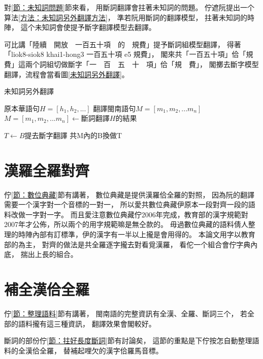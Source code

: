 對\ref{節：未知詞問題}節來看，
用斷詞翻譯會拄著未知詞的問題。
佇遮阮提出一个算法\ref{方法：未知詞另外翻譯方法}，
準若阮用斷詞的翻譯模型，
拄著未知詞的時陣，
這个未知詞會使提予斷字翻譯模型去翻譯。

可比講「陸續　開放　一百五十項　的　規費」提予斷詞組模型翻譯，
得著「liok8-siok8 khai1-hong3 一百五十項 e5 規費」，
閣來共「一百五十項」佮「規費」這兩个詞組切做斷字「一　百　五　十　項」佮「規　費」，
閣擲去斷字模型翻譯，流程會當看圖\ref{未知詞另外翻譯}。

\begin{algorithm}
  \caption{未知詞另外翻譯}
  \label{方法：未知詞另外翻譯方法}
  \begin{algorithmic}
    \REQUIRE \( 原本華語句H = [h_{1}, h_{2},...] \)
    \ENSURE \( 翻譯閩南語句M = [m_{1}, m_{2},...m_{n}] \)
    \STATE \( M = [m_{1}, m_{2},...m_{n}] \gets 斷詞翻譯H的結果 \)
    
		\STATE \( T \gets B提去斷字翻譯 \)
		\STATE 共M內的B換做T
	\ENDWHILE
  \end{algorithmic}
\end{algorithm}


\section{漢羅全羅對齊}
\label{節：漢羅全羅對齊}
佇\ref{節：數位典藏}節有講著，
數位典藏是提供漢羅佮全羅的對照，
因為阮的翻譯需要一个漢字對一个音標的一對一，
所以愛共數位典藏伊原本一段對齊一段的語料改做一字對一字。
而且愛注意數位典藏佇2006年完成，教育部的漢字規範對2007年才公佈，所以兩个的用字規範嘛是無仝款的。
毋過數位典藏的語料倩人整理的時陣內部有訂標準，伊的漢字有一半以上攏是會用得的。
本論文用字以教育部的為主，
對齊的做法是共全羅逐字攏去對看覓漢羅，
看佗一个組合會佇字典內底，
揣出上長的組合。


\section{補全漢佮全羅}
\label{節：補全漢佮全羅}
佇\ref{節：整理語料}節有講著，
閩南語的完整資訊有全漢、全羅、斷詞三个，
若全部的語料攏有這三種資訊，
翻譯效果會閣較好。

斷詞的部份佇\ref{節：拄好長度斷詞}節有討論矣，
這節的重點是下佇按怎自動整理語料的全漢佮全羅，
替補起哩欠的漢字佮羅馬音標。

